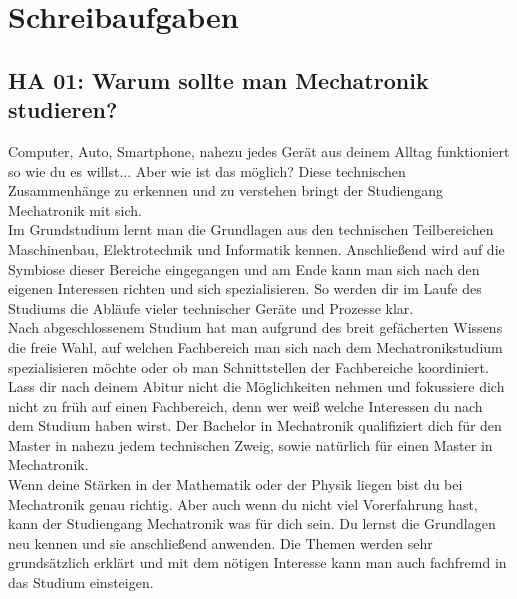 \chapter{Schreibaufgaben}
\section{HA 01: Warum sollte man Mechatronik studieren?}
  Computer, Auto, Smartphone, nahezu jedes Gerät aus deinem Alltag funktioniert so wie du es willst... Aber wie ist das möglich? Diese technischen Zusammenhänge zu erkennen und zu verstehen bringt der Studiengang Mechatronik mit sich.\\
  Im Grundstudium lernt man die Grundlagen aus den technischen Teilbereichen Maschinenbau, Elektrotechnik und Informatik kennen. Anschließend wird auf die Symbiose dieser Bereiche eingegangen und am Ende kann man sich nach den eigenen Interessen richten und sich spezialisieren. So werden dir im Laufe des Studiums die Abläufe vieler technischer Geräte und Prozesse klar.\\
  Nach abgeschlossenem Studium hat man aufgrund des breit gefächerten Wissens die freie Wahl, auf welchen Fachbereich man sich nach dem Mechatronikstudium spezialisieren möchte oder ob man Schnittstellen der Fachbereiche koordiniert.\\
  Lass dir nach deinem Abitur nicht die Möglichkeiten nehmen und fokussiere   dich nicht zu früh auf einen Fachbereich, denn wer weiß welche Interessen du nach dem Studium haben wirst. Der Bachelor in Mechatronik qualifiziert dich für den Master in nahezu jedem technischen Zweig, sowie natürlich für einen Master in Mechatronik.\\
  Wenn deine Stärken in der Mathematik oder der Physik liegen bist du bei Mechatronik genau richtig. Aber auch wenn du nicht viel Vorerfahrung hast, kann der Studiengang Mechatronik was für dich sein. Du lernst die Grundlagen neu kennen und sie anschließend anwenden. Die Themen werden sehr grundsätzlich erklärt und mit dem nötigen Interesse kann man auch fachfremd in das Studium einsteigen.

